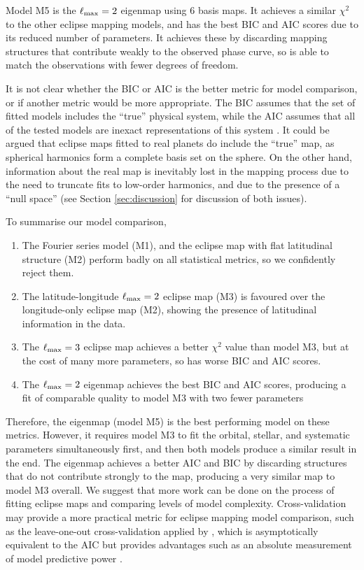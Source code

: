\documentclass[twocolumn]{aastex631}
\begin{document}
Model M5 is the $\ell_{\rm max}=2$ eigenmap using 6 basis maps. It achieves a similar $\chi^{2}$ to the other eclipse mapping models, and has the best BIC and AIC scores due to its reduced number of parameters. It achieves these by discarding mapping structures that contribute weakly to the observed phase curve, so is able to match the observations with fewer degrees of freedom.

It is not clear whether the BIC or AIC is the better metric for model comparison, or if another metric would be more appropriate. The BIC assumes that the set of fitted models includes the ``true'' physical system, while the AIC assumes that all of the tested models are inexact representations of this system \citep{burnham2004multimodel}. It could be argued that eclipse maps fitted to real planets do include the ``true'' map, as spherical harmonics form a complete basis set on the sphere. On the other hand, information about the real map is inevitably lost in the mapping process due to the need to truncate fits to low-order harmonics, and due to the presence of a ``null space'' (see Section \ref{sec:discussion} for discussion of both issues). 

To summarise our model comparison,

\begin{enumerate}
    \item The Fourier series model (M1), and the eclipse map with flat latitudinal structure (M2) perform badly on all statistical metrics, so we confidently reject them.
    \item The latitude-longitude $\ell_{\rm max}=2$ eclipse map (M3) is favoured over the longitude-only eclipse map (M2), showing the presence of latitudinal information in the data.
    \item The $\ell_{\rm max}=3$ eclipse map achieves a better $\chi^{2}$ value than model M3, but at the cost of many more parameters, so has worse BIC and AIC scores.
    \item The $\ell_{\rm max}=2$ eigenmap achieves the best BIC and AIC scores, producing a fit of comparable quality to model M3 with two fewer parameters
\end{enumerate}

Therefore, the eigenmap (model M5) is the best performing model on these metrics. However, it requires model M3 to fit the orbital, stellar, and systematic parameters simultaneously first, and then both models produce a similar result in the end. The eigenmap achieves a better AIC and BIC by discarding structures that do not contribute strongly to the map, producing a very similar map to model M3 overall. We suggest that more work can be done on the process of fitting eclipse maps and comparing levels of model complexity. Cross-validation may provide a more practical metric for eclipse mapping model comparison, such as the leave-one-out cross-validation applied by \citet{challener2023bringing}, which is asymptotically equivalent to the AIC but provides advantages such as an absolute measurement of model predictive power \citep{stone1977asymptotic}.
\end{document}
